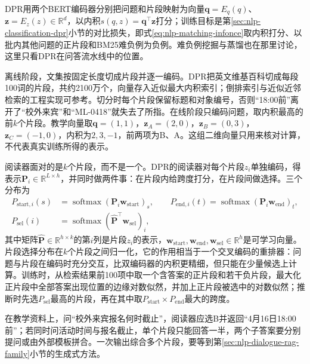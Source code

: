 DPR用两个BERT编码器分别把问题和片段映射为向量$\bm q=E_q(q)$、$\bm z=E_z(z)\in\mathbb R^{d}$，以内积$s(q,z)=\bm q^{\top}\bm z$打分；训练目标是第\ref{sec:nlp-classification-dpr}小节的对比损失，即式\eqref{eq:nlp-matching-infonce}取内积打分、以批内其他问题的正片段和BM25难负例为负例。难负例挖掘与蒸馏也在那里讨论，这里只看DPR在问答流水线中的位置。

离线阶段，文集按固定长度切成片段并逐一编码。DPR把英文维基百科切成每段100词的片段，共约2100万个，向量存入近似最大内积索引；倒排索引与近似近邻检索的工程实现可参考。切分时每个片段保留标题和对象编号，否则“18:00前”离开了“校外来宾”和“ML-0418”就失去了所指。在线阶段只编码问题，取内积最高的前$k$个片段。教学向量取$\bm q=(1,1)$，$\bm z_A=(2,0)$，$\bm z_B=(0,3)$，$\bm z_C=(-1,0)$，内积为$2,3,-1$，前两项为B、A。这组二维向量只用来核对计算，不代表真实训练所得的表示。

阅读器面对的是$k$个片段，而不是一个。DPR的阅读器对每个片段$z_i$单独编码，得表示$\bm P_i\in\mathbb R^{L\times h}$，并同时做两件事：在片段内给跨度打分，在片段间做选择。三个分布为
\begin{equation}
\begin{aligned}
  P_{\mathrm{start},i}(s)&=\operatorname{softmax}(\bm P_i\bm w_{\mathrm{start}})_s,\qquad
  P_{\mathrm{end},i}(t)=\operatorname{softmax}(\bm P_i\bm w_{\mathrm{end}})_t,\\
  P_{\mathrm{sel}}(i)&=\operatorname{softmax}(\widehat{\bm P}^{\top}\bm w_{\mathrm{sel}})_i,
\end{aligned}
  \label{eq:nlp-dialogue-dpr-reader}
\end{equation}
其中矩阵$\widehat{\bm P}\in\mathbb R^{h\times k}$的第$i$列是片段$z_i$的\code{[CLS]}表示，$\bm w_{\mathrm{start}},\bm w_{\mathrm{end}},\bm w_{\mathrm{sel}}\in\mathbb R^{h}$是可学习向量。片段选择分布在$k$个片段之间归一化，它的作用相当于一个交叉编码的重排器：问题与片段在编码时充分交互，比双编码器的内积更精细，但只能在少量候选上计算。训练时，从检索结果前100项中取一个含答案的正片段和若干负片段，最大化正片段中全部答案出现位置的边缘对数似然，并加上正片段被选中的对数似然；推断时先选$P_{\mathrm{sel}}$最高的片段，再在其中取$P_{\mathrm{start}}\times P_{\mathrm{end}}$最大的跨度。

在教学资料上，问“校外来宾报名何时截止”，阅读器应选B并返回“4月16日18:00前”；若同时问活动时间与报名截止，单个片段只能回答一半，两个子答案要分别提问或由外部模板拼合。一次输出综合多个片段，要等到第\ref{sec:nlp-dialogue-rag-family}小节的生成式方法。


